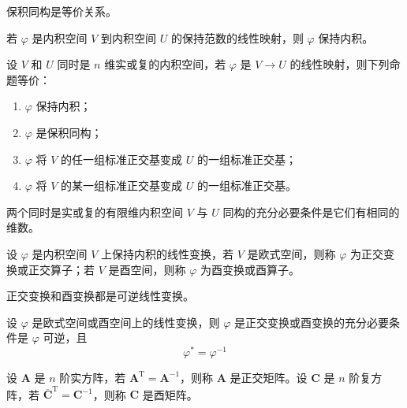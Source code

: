 \begin{remark}
    保积同构是等价关系。
\end{remark}

\begin{proposition}
    若 $\varphi$ 是内积空间 $V$ 到内积空间 $U$ 的保持范数的线性映射，则 $\varphi$ 保持内积。
\end{proposition}

\begin{theorem}
    设 $V$ 和 $U$ 同时是 $n$ 维实或复的内积空间，若 $\varphi$ 是 $V \to U$ 的线性映射，则下列命题等价：
    \begin{enumerate}
        \item $\varphi$ 保持内积；
        \item $\varphi$ 是保积同构；
        \item $\varphi$ 将 $V$ 的任一组标准正交基变成 $U$ 的一组标准正交基；
        \item $\varphi$ 将 $V$ 的某一组标准正交基变成 $U$ 的一组标准正交基。
    \end{enumerate}
\end{theorem}

\begin{corollary}
    两个同时是实或复的有限维内积空间 $V$ 与 $U$ 同构的充分必要条件是它们有相同的维数。
\end{corollary}

\begin{definition}
    设 $\varphi$ 是内积空间 $V$ 上保持内积的线性变换，若 $V$ 是欧式空间，则称 $\varphi$ 为正交变换或正交算子；若 $V$ 是酉空间，则称 $\varphi$ 为酉变换或酉算子。
\end{definition}

\begin{remark}
    正交变换和酉变换都是可逆线性变换。
\end{remark}

\begin{theorem}
    设 $\varphi$ 是欧式空间或酉空间上的线性变换，则 $\varphi$ 是正交变换或酉变换的充分必要条件是 $\varphi$ 可逆，且
    \[
        \varphi^{*} = \varphi^{-1}
    \]
\end{theorem}

\begin{definition}
    设 $\bm{A}$ 是 $n$ 阶实方阵，若 $\bm{A}^{\mathrm{T}} = \bm{A}^{-1}$，则称 $\bm{A}$ 是正交矩阵。设 $\bm{C}$ 是 $n$ 阶复方阵，若 $\overline{\bm{C}}^{\mathrm{T}} = \bm{C}^{-1}$，则称 $\bm{C}$ 是酉矩阵。
\end{definition}

